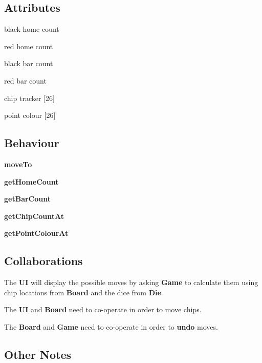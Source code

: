 \documentclass{report}
\begin{document}
    \newpage
    \begin{multicols}{2}
        \begin{dashed}
            \subsection{Attributes}
            \item black home count
            \item red home count
            \item black bar count
            \item red bar count
            \item chip tracker [26]
            \item point colour [26]
        \end{dashed}

        \begin{dashed}
            \subsection{Behaviour}
            \item \textbf{moveTo}
            \item \textbf{getHomeCount}
            \item \textbf{getBarCount}
            \item \textbf{getChipCountAt}
            \item \textbf{getPointColourAt}
        \end{dashed}
    \end{multicols}

    \subsection{Collaborations}

    \begin{dashed}
        \item The \textbf{UI} will display the possible moves by asking \textbf{Game} to calculate them using chip locations from \textbf{Board} and the dice from \textbf{Die}.
        \item The \textbf{UI} and \textbf{Board} need to co-operate in order to move chips.
        \item The \textbf{Board} and \textbf{Game} need to co-operate in order to \textbf{undo} moves.
    \end{dashed}

    \subsection{Other Notes}
\end{document}
